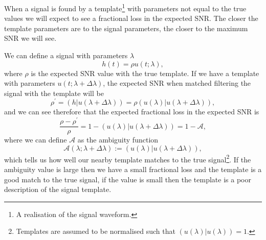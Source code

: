 When a signal is found by a template\footnote{A realisation of the \gwadj signal waveform.} with parameters not equal to the true values we will expect to see a fractional loss in the expected SNR. The closer the template parameters are to the signal parameters, the closer to the maximum SNR we will see. 

We can define a signal with parameters $\lambda$
%
\begin{equation}
    h(t) = \rho u(t;\lambda),
\end{equation}
where $\rho$ is the expected SNR value with the true template. If we have a template with parameters $u(t;\lambda + \Delta \lambda)$, the expected SNR when matched filtering the signal with the template will be
%
\begin{equation}
    \rho^{\prime} = (h|u(\lambda + \Delta \lambda)) = \rho(u(\lambda)|u(\lambda + \Delta \lambda)),
\end{equation}
%
and we can see therefore that the expected fractional loss in the expected SNR is
%
\begin{equation}
    \frac{\rho - \rho^{\prime}}{\rho} = 1 - (u(\lambda)|u(\lambda + \Delta \lambda)) = 1 - \mathcal{A},
\end{equation}
%
where we can define $\mathcal{A}$ as the ambiguity function
%
\begin{equation}
    \mathcal{A}(\lambda;\lambda + \Delta \lambda) := (u(\lambda)|u(\lambda + \Delta \lambda)),
\end{equation}
%
which tells us how well our nearby template matches to the true signal\footnote{Templates are assumed to be normalised such that $(u(\lambda)|u(\lambda)) = 1$.}. If the ambiguity value is large then we have a small fractional loss and the template is a good match to the true signal, if the value is small then the template is a poor description of the signal template.

